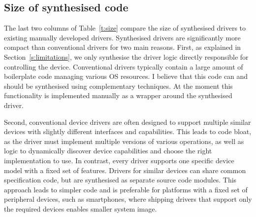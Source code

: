 %
%
%


\subsection{Size of synthesised code} 
The last two columns of Table~\ref{t:size} compare the size of synthesised drivers to existing manually developed drivers.  Synthesised drivers are significantly more compact than conventional drivers for two main reasons.  First, as explained in Section~\ref{s:limitations}, we only synthesise the driver logic directly responsible for controlling the device.  Conventional drivers typically contain a large amount of boilerplate code managing various OS resources.  I believe that this code can and should be synthesised using complementary techniques.  At the moment this functionality is implemented manually as a wrapper around the synthesised driver. 

Second, conventional device drivers are often designed to support multiple similar devices with slightly different interfaces and capabilities.  This leads to code bloat, as the driver must implement multiple versions of various operations, as well as logic to dynamically discover device capabilities and choose the right implementation to use.  In contrast, every \termite driver supports one specific device model with a fixed set of features.  Drivers for similar devices can share common specification code, but are synthesised as separate source code modules.  This approach leads to simpler code and is preferable for platforms with a fixed set of peripheral devices, such as smartphones, where shipping drivers that support only the required devices enables smaller system image.
  
